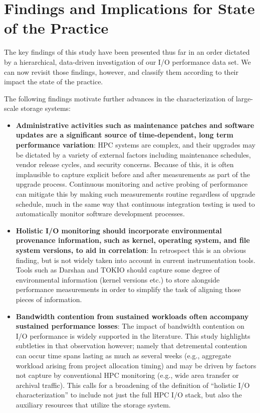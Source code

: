 \section{Findings and Implications for State of the Practice}
\label{sec:findings}

The key findings of this study have been presented thus far in an
order dictated by a hierarchical, data-driven investigation of our
I/O performance data set.  We can now revisit those findings, however,
and classify them according to their impact the state of
the practice.

The following findings motivate further advances in the characterization of
large-scale storage systems:

\begin{itemize}

\item \textbf{Administrative activities such as maintenance patches and
software updates are a significant source of time-dependent, long term
performance variation}: HPC systems are complex, and their upgrades may be
dictated by a variety of external factors including maintenance schedules,
vendor release cycles, and security concerns.  Because of this, it is often
implausible to capture explicit before and after measurements as part of the
upgrade process.  Continuous monitoring and active probing of performance
can mitigate this by making such measurements routine regardless of upgrade
schedule, much in the same way that continuous integration  testing is used
to automatically monitor software development processes.

\item \textbf{Holistic I/O monitoring should incorporate environmental
provenance information, such as kernel, operating system, and file system
versions, to aid in correlation}: 
In retrospect this is an obvious finding, but is not widely taken into
account in current instrumentation tools.  Tools such as Darshan and
TOKIO should capture some degree of environmental information (kernel
versions etc.) to store alongside performance measurements in order to
simplify the task of aligning those pieces of information.

\item \textbf{Bandwidth contention from sustained workloads often accompany
sustained performance losses}: The impact of bandwidth contention on I/O
performance is widely supported in the literature.  This study highlights
subtleties in that observation however; namely that detremental contention
can occur time spans lasting as much as several weeks (e.g., aggregate
workload arising from project allocation timing) and may be driven by factors 
not capture by conventional HPC monitoring (e.g., wide area transfer or 
archival traffic).  This calls for a broadening of the definition of
``holistic I/O characterization'' to include not just the full HPC I/O
stack, but also the auxiliary resources that utilize the storage system.

\end{itemize}

